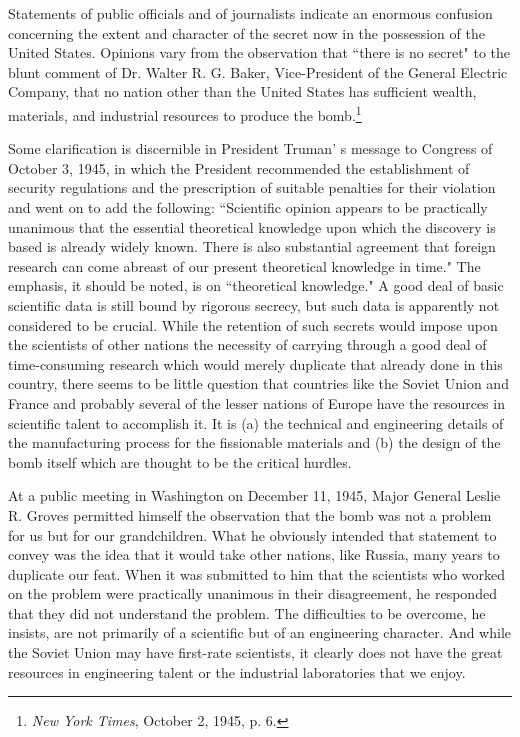 Statements of public officials and of journalists indicate an enormous confusion concerning the extent and character of the secret now in the possession of the United States. Opinions vary from the observation that ``there is no secret" to the blunt comment of Dr. Walter R. G. Baker, Vice-President of the General Electric Company, that no nation other than the United States has sufficient wealth, materials, and industrial resources to produce the bomb.\footnote{\textit{New York Times}, October 2, 1945, p. 6.}

Some clarification is discernible in President Truman' s message to Congress of October 3, 1945, in which the President recommended the establishment of security regulations and the prescription of suitable penalties for their violation and went on to add the following: ``Scientific opinion appears to be practically unanimous that the essential theoretical knowledge upon which the discovery is based is already widely known. There is also substantial agreement that foreign research can come abreast of our present theoretical knowledge in time." The emphasis, it should be noted, is on ``theoretical knowledge." A good deal of basic scientific data is still bound by rigorous secrecy, but such data is apparently not considered to be crucial. While the retention of such secrets would impose upon the scientists of other nations the necessity of carrying through a good deal of time-consuming research which would merely duplicate that already done in this country, there seems to be little question that countries like the Soviet Union and France and probably several of the lesser nations of Europe have the resources in scientific talent to accomplish it. It is (a) the technical and engineering details of the manufacturing process for the fissionable materials and (b) the design of the bomb itself which are thought to be the critical hurdles.

At a public meeting in Washington on December 11, 1945, Major General Leslie R. Groves permitted himself the observation that the bomb was not a problem for us but for our grandchildren. What he obviously intended that statement to convey was the idea that it would take other nations, like Russia, many years to duplicate our feat. When it was submitted to him that the scientists who worked on the problem were practically unanimous in their disagreement, he responded that they did not understand the problem. The difficulties to be overcome, he insists, are not primarily of a scientific but of an engineering character. And while the Soviet Union may have first-rate scientists, it clearly does not have the great resources in engineering talent or the industrial laboratories that we enjoy.

